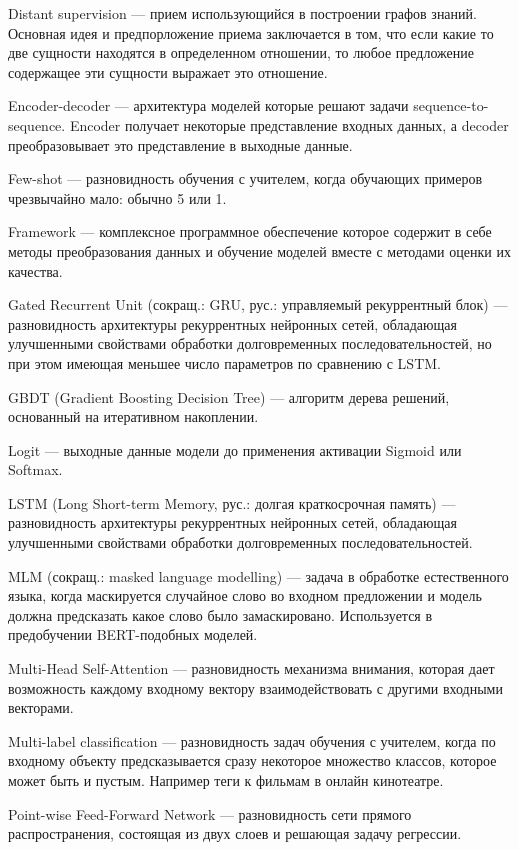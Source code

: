 Distant supervision --- прием использующийся в построении графов знаний. Основная идея и предпорложение приема заключается в том, что если какие то две сущности находятся в определенном отношении, то любое предложение содержащее эти сущности выражает это отношение.

Encoder-decoder --- архитектура моделей которые решают задачи sequence-to-sequence. Encoder получает некоторые представление входных данных, а decoder преобразовывает это представление в выходные данные.

Few-shot --- разновидность обучения с учителем, когда обучающих примеров чрезвычайно мало: обычно 5 или 1.

Framework --- комплексное программное обеспечение которое содержит в себе методы преобразования данных и обучение моделей вместе с методами оценки их качества.

Gated Recurrent Unit (сокращ.: GRU, рус.: управляемый рекуррентный блок) --- разновидность архитектуры рекуррентных нейронных сетей, обладающая улучшенными свойствами обработки долговременных последовательностей, но при этом имеющая меньшее число параметров по сравнению с LSTM.

GBDT (Gradient Boosting Decision Tree) --- алгоритм дерева решений, основанный на итеративном накоплении.

Logit --- выходные данные модели до применения активации Sigmoid или Softmax.

LSTM (Long Short-term Memory, рус.: долгая краткосрочная память) --- разновидность архитектуры рекуррентных нейронных сетей, обладающая улучшенными свойствами обработки долговременных последовательностей.

MLM (сокращ.: masked language modelling) --- задача в обработке естественного языка, когда маскируется случайное слово во входном предложении и модель должна предсказать какое слово было замаскировано. Используется в предобучении BERT-подобных моделей.

Multi-Head Self-Attention --- разновидность механизма внимания, которая дает возможность каждому входному вектору взаимодействовать с другими входными векторами.

Multi-label classification --- разновидность задач обучения с учителем, когда по входному объекту предсказывается сразу некоторое множество классов, которое может быть и пустым. Например теги к фильмам в онлайн кинотеатре.

Point-wise Feed-Forward Network --- разновидность сети прямого распространения, состоящая из двух слоев и решающая задачу регрессии.

